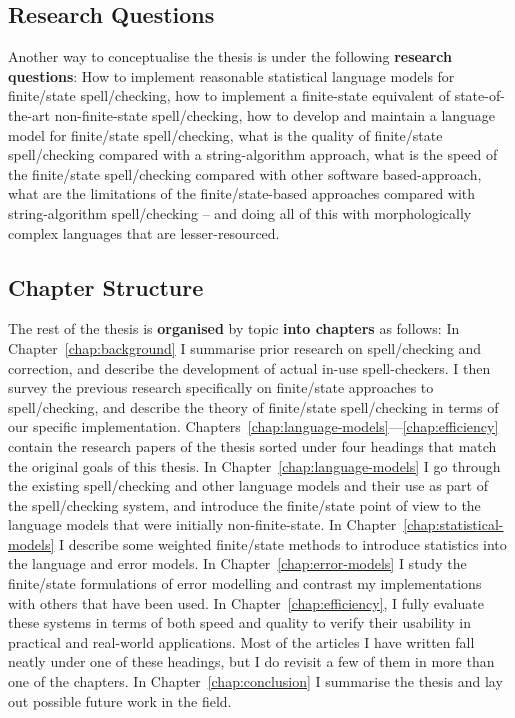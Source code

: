 \documentclass[officiallayout,final]{unihelcompling}
\begin{document}
\subsection{Research Questions}
\label{subsec:questions}

Another way to conceptualise the thesis is under the following \textbf{research
questions}: How to implement reasonable statistical language models for
finite\-/state spell\-/checking, how to implement a finite-state equivalent of
state-of-the-art non-finite-state spell\-/checking, how to develop and maintain
a language model for finite\-/state spell\-/checking, what is the quality of
finite\-/state spell\-/checking compared with a string-algorithm approach, what
is the speed of the finite\-/state spell\-/checking compared with other
software based-approach, what are the limitations of the finite\-/state-based
approaches compared with string-algorithm spell\-/checking -- and doing all of
this with morphologically complex languages that are lesser-resourced.

\subsection{Chapter Structure}

The rest of the thesis is \textbf{organised} by topic \textbf{into chapters} as
follows: In Chapter~\ref{chap:background} I summarise prior research on
spell\-/checking and correction, and describe the development of actual in-use
spell-checkers. I then survey the previous research specifically on
finite\-/state approaches to spell\-/checking, and describe the theory of
finite\-/state spell\-/checking in terms of our specific implementation.
Chapters~\ref{chap:language-models}---\ref{chap:efficiency} contain the
research papers of the thesis sorted under four headings that match the
original goals of this thesis.  In Chapter~\ref{chap:language-models} I go
through the existing spell\-/checking and other language models and their use
as part of the spell\-/checking system, and introduce the finite\-/state point
of view to the language models that were initially non-finite-state.  In
Chapter~\ref{chap:statistical-models} I describe some weighted finite\-/state
methods to introduce statistics into the language and error models.  In
Chapter~\ref{chap:error-models} I study the finite\-/state formulations of
error modelling and contrast my implementations with others that have been
used.  In Chapter~\ref{chap:efficiency}, I fully evaluate these systems in
terms of both speed and quality to verify their usability in practical and
real-world applications.  Most of the articles I have written fall neatly under
one of these headings, but I do revisit a few of them in more than one of the
chapters. In Chapter~\ref{chap:conclusion} I summarise the thesis and lay out
possible future work in the field.
\end{document}
